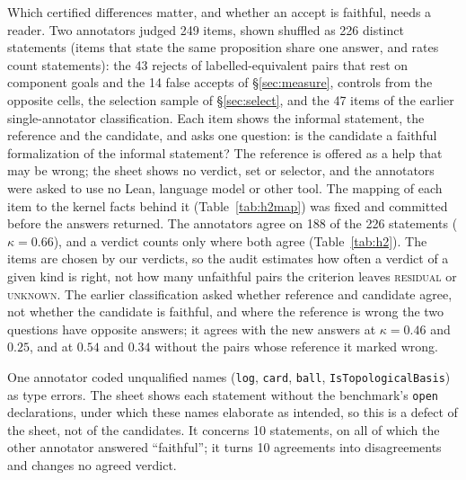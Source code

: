 \documentclass[10pt]{article}
\theoremstyle{definition}
\newcommand{\V}[1]{\textsc{#1}}
\begin{document}
Which certified differences matter, and whether an accept is faithful, needs a reader. Two
annotators judged 249 items, shown shuffled as 226 distinct statements (items that state the
same proposition share one answer, and rates count statements): the 43 rejects of
labelled-equivalent pairs that rest on component goals and the 14 false accepts of
\S\ref{sec:measure}, controls from the opposite cells, the selection sample of
\S\ref{sec:select}, and the 47 items of the earlier single-annotator classification. Each item
shows the informal statement, the reference and the candidate, and asks one question: is the
candidate a faithful formalization of the informal statement? The reference is offered as a help
that may be wrong; the sheet shows no verdict, set or selector, and the annotators were asked to
use no Lean, language model or other tool. The mapping of each item to the kernel facts behind it
(Table~\ref{tab:h2map}) was fixed and committed before the answers returned. The annotators
agree on 188 of the 226 statements ($\kappa=0.66$), and a verdict counts only where both agree
(Table~\ref{tab:h2}). The items are chosen by our verdicts, so the audit estimates how often a
verdict of a given kind is right, not how many unfaithful pairs the criterion leaves
\V{residual} or \V{unknown}. The earlier classification asked whether reference and candidate agree,
not whether the candidate is faithful, and where the reference is wrong the two questions have
opposite answers; it agrees with the new answers at $\kappa=0.46$ and $0.25$, and at $0.54$ and
$0.34$ without the pairs whose reference it marked wrong.

One annotator coded unqualified names (\texttt{log}, \texttt{card}, \texttt{ball},
\texttt{IsTopologicalBasis}) as type errors. The sheet shows each statement without the
benchmark's \texttt{open} declarations, under which these names elaborate as intended, so this is
a defect of the sheet, not of the candidates. It concerns 10 statements, on all of which the
other annotator answered ``faithful''; it turns 10 agreements into disagreements and changes no
agreed verdict.
\end{document}
